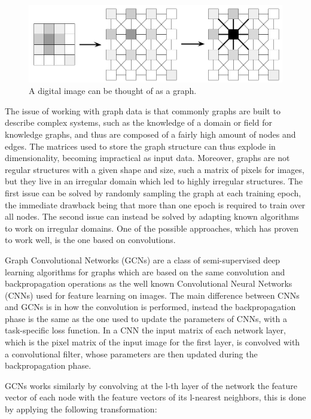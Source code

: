 \documentclass[%
    corpo=13.5pt,
    twoside,
    oldstyle,
    tipotesi=magistrale,
    greek,
    evenboxes
]{toptesi}
\begin{document}
\begin{figure}[h]
    \centering
    \includegraphics[scale=0.4]{img/pixels-as-graph.png}
    \caption{A digital image can be thought of as a graph.}
    \label{fig:pixels-as-graph}
\end{figure}

The issue of working with graph data is that commonly graphs
are built to describe complex systems, such as the knowledge of a
domain or field for knowledge graphs, and thus are composed of
a fairly high amount of nodes and edges. The matrices used to
store the graph structure can thus explode in dimensionality, becoming
impractical as input data. Moreover, graphs are not
regular structures with a given shape and size, such a matrix of pixels
for images, but they live in an irregular domain which led to highly
irregular structures.
The first issue can be solved by randomly sampling the graph at each
training epoch, the immediate drawback being that more than one epoch
is required to train over all nodes. The second issue can instead be
solved by adapting known algorithms to work on irregular domains.
One of the possible approaches, which has proven to work well, is
the one based on convolutions.

Graph Convolutional Networks (GCNs) \cite{kipf2016} are a class of
semi-supervised deep learning algorithms for graphs which are based on the
same convolution and backpropagation operations as the well known
Convolutional Neural Networks (CNNs) used for feature learning on
images.
The main difference between CNNs and GCNs is in how the convolution is
performed, instead the backpropagation phase is the same as the one
used to update the parameters of CNNs, with a task-specific loss function.
In a CNN the input matrix of each network layer, which is the pixel matrix
of the input image for the first layer, is convolved with a convolutional
filter, whose parameters are then updated during the backpropagation phase.

GCNs works similarly by convolving at the l-th layer
of the network the feature vector of each node with the feature
vectors of its l-nearest neighbors, this is done by applying the following
transformation:
\end{document}
